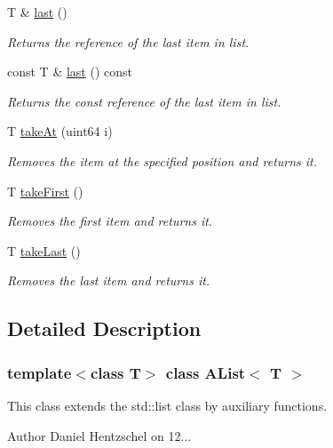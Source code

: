 \begin{DoxyCompactItemize}
T \& \mbox{\hyperlink{class_a_list_a41b07290930bbfa06ec02f9106a52b74}{last}} ()
\begin{DoxyCompactList}\small\item\em Returns the reference of the last item in list. \end{DoxyCompactList}\item 
const T \& \mbox{\hyperlink{class_a_list_ab6c0fc542c318f68199ef3b4d97c82f4}{last}} () const
\begin{DoxyCompactList}\small\item\em Returns the const reference of the last item in list. \end{DoxyCompactList}\item 
T \mbox{\hyperlink{class_a_list_a26e974f6914da40b2e783edeac3c0665}{take\+At}} (uint64 i)
\begin{DoxyCompactList}\small\item\em Removes the item at the specified position and returns it. \end{DoxyCompactList}\item 
T \mbox{\hyperlink{class_a_list_af2da906ed8c9bf282fc9f6f726864d9f}{take\+First}} ()
\begin{DoxyCompactList}\small\item\em Removes the first item and returns it. \end{DoxyCompactList}\item 
T \mbox{\hyperlink{class_a_list_aa210fddef3bf64dd63dd68f3d5f2fe05}{take\+Last}} ()
\begin{DoxyCompactList}\small\item\em Removes the last item and returns it. \end{DoxyCompactList}\end{DoxyCompactItemize}


\subsection{Detailed Description}
\subsubsection*{template$<$class T$>$\newline
class A\+List$<$ T $>$}

This class extends the std\+::list class by auxiliary functions. 

\begin{DoxyAuthor}{Author}
Daniel Hentzschel on 12... 
\end{DoxyAuthor}


